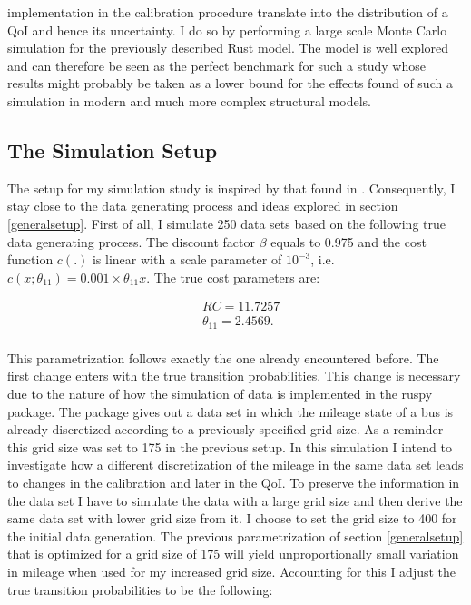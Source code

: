implementation in the calibration procedure translate into the distribution of a QoI and hence its uncertainty. I do so by performing a large scale Monte Carlo simulation for the previously described Rust model. The model is well explored and can therefore be seen as the perfect benchmark for such a study whose results might probably be taken as a lower bound for the effects found of such a simulation in modern and much more complex structural models.

\subsection{The Simulation Setup}

The setup for my simulation study is inspired by that found in \cite{Iskhakov.2016}. Consequently, I stay close to the data generating process and ideas explored in section \ref{generalsetup}. First of all, I simulate 250 data sets based on the following true data generating process. The discount factor $\beta$ equals to 0.975 and the cost function $c(.)$ is linear with a scale parameter of $10^{-3}$, i.e. $c(x; \theta_{11}) = 0.001 \times \theta_{11} x$. The true cost parameters are:

\begin{equation*}
\begin{split}
& RC = 11.7257 \\
& \theta_{11} = 2.4569 . \\
\end{split}
\end{equation*}

This parametrization follows exactly the one already encountered before. The first change enters with the true transition probabilities. This change is necessary due to the nature of how the simulation of data is implemented in the ruspy package. The package gives out a data set in which the mileage state of a bus is already discretized according to a previously specified grid size. As a reminder this grid size was set to 175 in the previous setup. In this simulation I intend to investigate how a different discretization of the mileage in the same data set leads to changes in the calibration and later in the QoI. To preserve the information in the data set I have to simulate the data with a large grid size and then derive the same data set with lower grid size from it. I choose to set the grid size to 400 for the initial data generation. The previous parametrization of section \ref{generalsetup} that is optimized for a grid size of 175 will yield unproportionally small variation in mileage when used for my increased grid size. Accounting for this I adjust the true transition probabilities to be the following:

